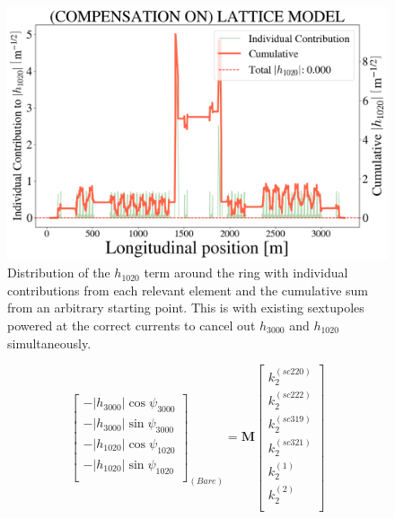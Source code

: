 \begin{figure}[H]
    \centering
    \includegraphics[width=\columnwidth]{chapter4/old_config_h1020.png}
    \caption{Distribution of the $h_{1020}$ term around the ring with individual contributions from each relevant element and the cumulative sum from an arbitrary starting point. This is with existing sextupoles powered at the correct currents to cancel out $h_{3000}$ and $h_{1020}$ simultaneously.}
    \label{fig:h1020oldconfig}
\end{figure}

\begin{equation}
    \begin{bmatrix}
        -|h_{3000}| \cos \psi_{3000} \\
        -|h_{3000}| \sin \psi_{3000} \\
        -|h_{1020}| \cos \psi_{1020} \\
        -|h_{1020}| \sin \psi_{1020} \\
        \end{bmatrix}_{(Bare)}
         =
        \boldsymbol{M}
        \begin{bmatrix}
        k_2^{(sc220)} \\
        k_2^{(sc222)}\\
        k_2^{(sc319)} \\
        k_2^{(sc321)}\\
        k_2^{(1)} \\
        k_2^{(2)}\\
        \end{bmatrix}
        \label{eq:systemadd}
\end{equation}

